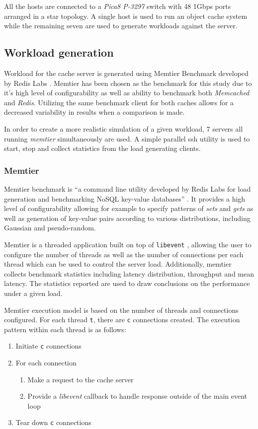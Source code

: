 All the hosts are connected to a \textit{Pica8 P-3297} switch with 48 1Gbps ports arranged in a star topology. A single host is used to run an object cache system while the remaining seven are used to generate workloads against the server.

\subsection{Workload generation}
Workload for the cache server is generated using Memtier Benchmark developed by Redis Labs \cite{memtier}. Memtier has been chosen as the benchmark for this study due to it's high level of configurability as well as ability to benchmark both \textit{Memcached} and \textit{Redis}. Utilizing the same benchmark client for both caches allows for a decreased variability in results when a comparison is made.

In order to create a more realistic simulation of a given workload, 7 servers all running \textit{memtier} simultaneously are used. A simple parallel ssh utility is used to start, stop and collect statistics from the load generating clients.

\subsubsection{Memtier}
Memtier benchmark is ``a command line utility developed by Redis Labs for load generation and benchmarking NoSQL key-value databases'' \cite{memtier}. It provides a high level of configurability allowing for example to specify patterns of \textit{sets} and \textit{gets} as well as generation of key-value pairs according to various distributions, including Gaussian and pseudo-random.

Memtier is a threaded application built on top of \texttt{libevent} \cite{libevent}, allowing the user to configure the number of threads as well as the number of connections per each thread which can be used to control the server load. Additionally, memtier collects benchmark statistics including latency distribution, throughput and mean latency. The statistics reported are used to draw conclusions on the performance under a given load.

Memtier execution model is based on the number of threads and connections configured. For each thread \texttt{t}, there are \texttt{c} connections created. The execution pattern within each thread is as follows:

\begin{enumerate}
    \item Initiate \texttt{c} connections
    \item For each connection
        \begin{enumerate}
            \item Make a request to the cache server
            \item Provide a \textit{libevent} callback to handle response outside of the main event loop
        \end{enumerate}
    \item Tear down \texttt{c} connections
\end{enumerate}

